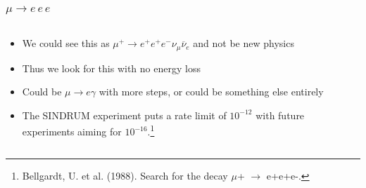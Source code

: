 \documentclass[11pt]{beamer}
\begin{document}
\begin{frame}
    \frametitle{$\mu\rightarrow e\,e\,e$}
    \begin{columns}[c]
        \begin{column}{0.6\textwidth}
            \begin{itemize}
                \item We could see this as $\mu^+\rightarrow e^+ e^+ e^- \nu_\mu \overline{\nu}_e$ and not be new physics
                \item Thus we look for this with no energy loss
                \item Could be $\mu \rightarrow e\gamma$ with more steps, or could be something else entirely
                \item The SINDRUM experiment puts a rate limit of $10^{-12}$ with future experiments aiming for $10^{-16}$.\footnote[frame]{Bellgardt, U. et al. (1988). Search for the decay $\mu$+ $\rightarrow$ e+e+e-.}
            \end{itemize}
        \end{column}

        \begin{column}{0.4\textwidth}
            \bigskip


\end{column}
\end{columns}
\end{frame}
\end{document}
